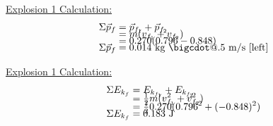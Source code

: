 \documentclass[12pt,letterpaper]{article}
\makeatletter
\newcommand{\sfrac}{\genfrac{}{}{}1}
\newcommand*\bigcdot{\mathpalette\bigcdot@{.5}}
\newcommand*\bigcdot@[2]{\mathbin{\vcenter{\hbox{\scalebox{#2}{$\m@th#1\bullet$}}}}}
\makeatother
\begin{document}
\hspace{0.5cm}
\begin{minipage}[t]{0.3\textwidth}
	\underline{Explosion 1  Calculation:}
	\vspace{-8mm}
	\[
		\begin{aligned}
			\Sigma\vec{p}_{f} & = \vec{p}_{f_{1}} + \vec{p}_{f_{2}}     \\[-8pt]
			                  & = m(v_{f_{1}} + v_{f_{2}})              \\[-8pt]
			                  & = 0.270(0.796 - 0.848)                  \\[-8pt]
			\Sigma\vec{p}_{f} & = 0.014~\text{kg $\bigcdot$ m/s [left]}
		\end{aligned}
	\]
\end{minipage}%
\hspace{0.75cm}
\begin{minipage}[t]{0.3\textwidth}
	\underline{Explosion 1  Calculation:}
	\vspace{-8mm}
	\[
		\begin{aligned}
			\Sigma E_{k_{f}} & = E_{k_{f_{1}}} + E_{k_{f_{2}}}            \\[-8pt]
			                 & = \sfrac{1}{2}m(v_{f_{1}}^2 + v_{f_{2}}^2) \\[-8pt]
			                 & = \sfrac{1}{2}0.270(0.796^2 + (-0.848)^2)  \\[-8pt]
			\Sigma E_{k_{f}} & = 0.183~\text{J}
		\end{aligned}
	\]
\end{minipage}%
\end{document}
